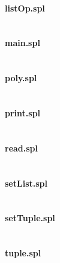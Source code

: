 \documentclass[a4paper]{article}
\begin{document}
\paragraph{listOp.spl}
\begin{verbatim}\end{verbatim}

\paragraph{main.spl}
\begin{verbatim}\end{verbatim}

\paragraph{poly.spl}
\begin{verbatim}\end{verbatim}

\paragraph{print.spl}
\begin{verbatim}\end{verbatim}

\paragraph{read.spl}
\begin{verbatim}\end{verbatim}

\paragraph{setList.spl}
\begin{verbatim}\end{verbatim}

\paragraph{setTuple.spl}
\begin{verbatim}\end{verbatim}

\paragraph{tuple.spl}
\begin{verbatim}\end{verbatim}
\end{document}
